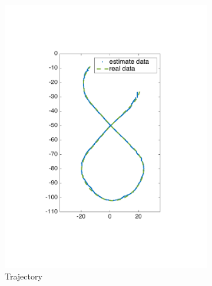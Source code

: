 \begin{figure}[!htbp]
  \centering
  \begin{subfigure}[b]{0.3\textwidth}
        \includegraphics[width=\textwidth]{img/high_altitude_error_xy.pdf}
        \caption{Trajectory}
        \label{fig:one}
   \end{subfigure} \hfill
   \begin{subfigure}[b]{0.32\textwidth}

\end{subfigure}
\end{figure}
